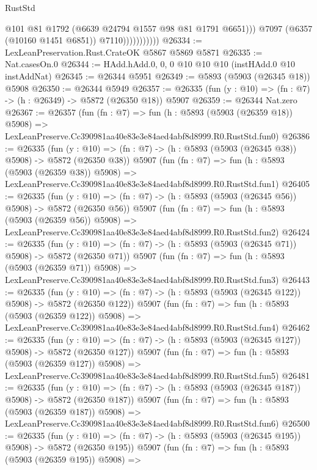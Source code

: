 \begin{lexlean}{RustStd}
\begin{coremodule}
                              @101
                              @81
                              @1792
                              (@6639 @24794 @1557 @98 @81 @1791 @6651)))
                          @7097
                          (@6357 (@10160 @1451 @6851))
                          @7110)))))))))))
@26334 := LexLeanPreservation.Rust.CrateOK @5867 @5869 @5871
@26335 := Nat.casesOn.{0}
@26344 := HAdd.hAdd.{0, 0, 0} @10 @10 @10 (instHAdd.{0} @10 instAddNat)
@26345 := @26344 @5951
@26349 := @5893 (@5903 (@26345 @18)) @5908
@26350 := @26344 @5949
@26357 := @26335 (fun (y : @10) => (fn : @7) -> (h : @26349) -> @5872 (@26350 @18)) @5907
@26359 := @26344 Nat.zero
@26367 := @26357
    (fun (fn : @7) =>
    fun (h : @5893 (@5903 (@26359 @18)) @5908) =>
    LexLeanPreserve.Cc390981aa40e83e3e84aed4abf8d8999.R0.RustStd.fun0)
@26386 := @26335
    (fun (y : @10) => (fn : @7) -> (h : @5893 (@5903 (@26345 @38)) @5908) -> @5872 (@26350 @38))
    @5907
    (fun (fn : @7) =>
    fun (h : @5893 (@5903 (@26359 @38)) @5908) =>
    LexLeanPreserve.Cc390981aa40e83e3e84aed4abf8d8999.R0.RustStd.fun1)
@26405 := @26335
    (fun (y : @10) => (fn : @7) -> (h : @5893 (@5903 (@26345 @56)) @5908) -> @5872 (@26350 @56))
    @5907
    (fun (fn : @7) =>
    fun (h : @5893 (@5903 (@26359 @56)) @5908) =>
    LexLeanPreserve.Cc390981aa40e83e3e84aed4abf8d8999.R0.RustStd.fun2)
@26424 := @26335
    (fun (y : @10) => (fn : @7) -> (h : @5893 (@5903 (@26345 @71)) @5908) -> @5872 (@26350 @71))
    @5907
    (fun (fn : @7) =>
    fun (h : @5893 (@5903 (@26359 @71)) @5908) =>
    LexLeanPreserve.Cc390981aa40e83e3e84aed4abf8d8999.R0.RustStd.fun3)
@26443 := @26335
    (fun (y : @10) => (fn : @7) -> (h : @5893 (@5903 (@26345 @122)) @5908) -> @5872 (@26350 @122))
    @5907
    (fun (fn : @7) =>
    fun (h : @5893 (@5903 (@26359 @122)) @5908) =>
    LexLeanPreserve.Cc390981aa40e83e3e84aed4abf8d8999.R0.RustStd.fun4)
@26462 := @26335
    (fun (y : @10) => (fn : @7) -> (h : @5893 (@5903 (@26345 @127)) @5908) -> @5872 (@26350 @127))
    @5907
    (fun (fn : @7) =>
    fun (h : @5893 (@5903 (@26359 @127)) @5908) =>
    LexLeanPreserve.Cc390981aa40e83e3e84aed4abf8d8999.R0.RustStd.fun5)
@26481 := @26335
    (fun (y : @10) => (fn : @7) -> (h : @5893 (@5903 (@26345 @187)) @5908) -> @5872 (@26350 @187))
    @5907
    (fun (fn : @7) =>
    fun (h : @5893 (@5903 (@26359 @187)) @5908) =>
    LexLeanPreserve.Cc390981aa40e83e3e84aed4abf8d8999.R0.RustStd.fun6)
@26500 := @26335
    (fun (y : @10) => (fn : @7) -> (h : @5893 (@5903 (@26345 @195)) @5908) -> @5872 (@26350 @195))
    @5907
    (fun (fn : @7) =>
    fun (h : @5893 (@5903 (@26359 @195)) @5908) =>

\end{coremodule}
\end{lexlean}
